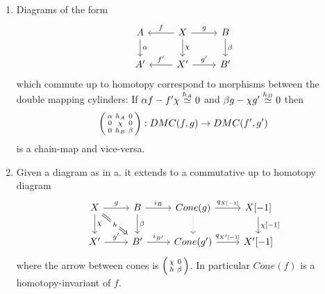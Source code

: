 \documentclass[fontsize=11pt,fleqn,a4paper]{scrartcl}
\begin{document}
\begin{theorem}[Functoriality]
\begin{enumerate}
\item Diagrams of the form
\[\begin{tikzcd}
A \ar[d,"\alpha"] & \ar[l,"f"'] X \ar[r,"g"] \ar[d,"\chi"] & B \ar[d,"\beta"] \\
A' & \ar[l,"f'"'] X' \ar[r,"g'"] & B'
\end{tikzcd}\]
which commute up to homotopy correspond to morphisms between the double mapping cylinders: If $\alpha f - f'\chi \homotopic[h_A]0$ and $\beta g -\chi g'\homotopic[h_B]0$ then
\[ \begin{psmallmatrix}\alpha& h_A & 0 \\ 0&\chi&0 \\ 0&h_B&\beta \end{psmallmatrix} : DMC(f,g) \to DMC(f',g')\]
is a chain-map and vice-versa.

\item Given a diagram as in a. it extends to a commutative up to homotopy diagram
\[\begin{tikzcd}
X \ar[r,"g"] \ar[d,"\chi"] \ar[rd,Rightarrow,"h" description] & B \ar[r,"i_B"] \ar[d,"\beta"] & Cone(g) \ar[r,"q_{X[-1]}"] \ar[d,dotted] & X[-1] \ar[d,"\chi{[-1]}"] \\
X' \ar[r,"g'"] & B' \ar[r,"i_{B'}"] & Cone(g') \ar[r,"q_{X'[-1]}"] & X'[-1] 
\end{tikzcd}\]
where the arrow between cones is $\begin{psmallmatrix}\chi & 0\\h & \beta\end{psmallmatrix}$. In particular $Cone(f)$ is a homotopy-invariant of $f$.
\end{enumerate}
\end{theorem}
\end{document}
